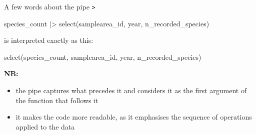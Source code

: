 \documentclass[
  ignorenonframetext,
  aspectratio=169,
]{beamer}
\newenvironment{Shaded}{\begin{snugshade}}{\end{snugshade}}
\newcommand{\FunctionTok}[1]{\textcolor[rgb]{0.28,0.35,0.67}{#1}}
\newcommand{\NormalTok}[1]{\textcolor[rgb]{0.00,0.23,0.31}{#1}}
\newcommand{\SpecialCharTok}[1]{\textcolor[rgb]{0.37,0.37,0.37}{#1}}
\providecommand{\tightlist}{%
  \setlength{\itemsep}{0pt}\setlength{\parskip}{0pt}}
\let\oldtexttt\texttt
\renewcommand{\texttt}[1]{\colorbox{gray!20}{\oldtexttt{#1}}}
\begin{document}
\begin{frame}[fragile]{A few words about the pipe
\texttt{\textbar{}\textgreater{}}}
\protect{}\label{a-few-words-about-the-pipe}
\footnotesize

\begin{Shaded}
\begin{Highlighting}[]
\NormalTok{species\_count }\SpecialCharTok{|\textgreater{}} \FunctionTok{select}\NormalTok{(samplearea\_id, year, n\_recorded\_species)}
\end{Highlighting}
\end{Shaded}

\normalsize

is interpreted exactly as this:

\footnotesize

\begin{Shaded}
\begin{Highlighting}[]
\FunctionTok{select}\NormalTok{(species\_count, samplearea\_id, year, n\_recorded\_species)}
\end{Highlighting}
\end{Shaded}

\normalsize

\textbf{NB:}

\begin{itemize}
\tightlist
\item
  the pipe captures what precedes it and considers it as the first
  argument of the function that follows it
\item
  it makes the code more readable, as it emphasises the sequence of
  operations applied to the data
\end{itemize}
\end{frame}
\end{document}
